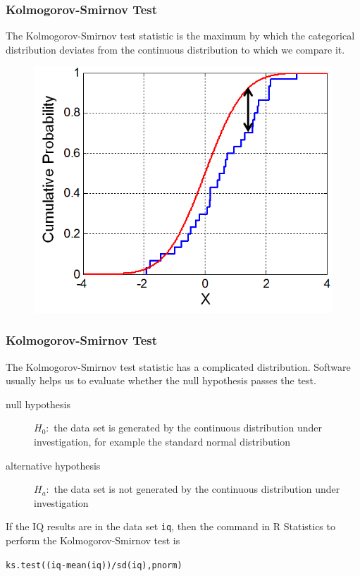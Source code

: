\documentclass[xcolor=dvipsnames]{beamer}
\begin{document}
\begin{frame}
  \frametitle{Kolmogorov-Smirnov Test}
  The Kolmogorov-Smirnov test statistic is the maximum by which the
  categorical distribution deviates from the continuous distribution
  to which we compare it.
\begin{figure}[h]
\includegraphics[scale=.6]{./diagrams/KS_Example.png}
\end{figure}
\end{frame}

\begin{frame}[fragile]
  \frametitle{Kolmogorov-Smirnov Test}
  The Kolmogorov-Smirnov test statistic has a complicated
  distribution. Software usually helps us to evaluate whether the null
  hypothesis passes the test.
  \begin{description}
  \item[null hypothesis] $H_{0}:$ the data set is generated by the
    continuous distribution under investigation, for example the
    standard normal distribution
  \item[alternative hypothesis] $H_{a}:$ the data set is not generated
    by the continuous distribution under investigation
  \end{description}
  If the IQ results are in the data set \texttt{iq}, then the command
  in R Statistics to perform the Kolmogorov-Smirnov test is
\begin{alltt}
ks.test((iq-mean(iq))/sd(iq),pnorm)
\end{alltt}
\end{frame}
\end{document}
